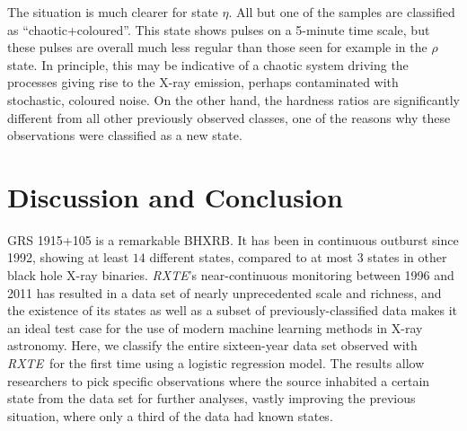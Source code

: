 \documentclass[fleqn,usenatbib]{mnras}
\newcommand{\project}[1]{\textsl{#1}}
\newcommand{\rxte}{\project{RXTE}}
\begin{document}
The situation is much clearer for state $\eta$. All but one of the samples are classified as ``chaotic+coloured''. This state shows pulses on a 5-minute time scale, but these pulses are overall much less regular than those seen for example in the $\rho$ state. In principle, this may be indicative of a chaotic system driving the processes giving rise to the X-ray emission, perhaps contaminated with stochastic, coloured noise. On the other hand, the hardness ratios are significantly different from all other previously observed classes, one of the reasons why these observations were classified as a new state. 


\section{Discussion and Conclusion}
\label{sec:discussion}

GRS 1915+105 is a remarkable BHXRB. It has been in continuous outburst since 1992, showing at least $14$ different states, compared to at most 
$3$ states in other black hole X-ray binaries.
\rxte's near-continuous monitoring between 1996 and 2011 has resulted in a data set of nearly unprecedented scale and richness, and the existence of its states as well as a subset of previously-classified data makes it an ideal test case for the use of modern machine learning methods in X-ray astronomy.
Here, we classify the entire sixteen-year data set observed with \rxte\ for the first time using a logistic regression model. 
The results allow researchers to pick specific observations where the source inhabited a certain state from the data set for further analyses, vastly improving 
the previous situation, where only a third of the data had known states.
\end{document}

